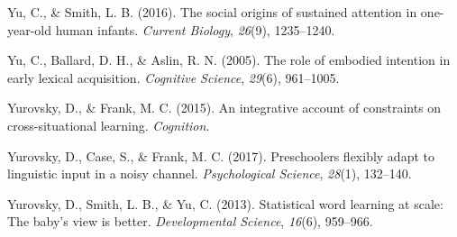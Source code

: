 \documentclass[oneside]{report}
\begin{document}
\hypertarget{ref-yu2016social}{}
Yu, C., \& Smith, L. B. (2016). The social origins of sustained
attention in one-year-old human infants. \emph{Current Biology},
\emph{26}(9), 1235--1240.

\hypertarget{ref-yu2005role}{}
Yu, C., Ballard, D. H., \& Aslin, R. N. (2005). The role of embodied
intention in early lexical acquisition. \emph{Cognitive Science},
\emph{29}(6), 961--1005.

\hypertarget{ref-yurovsky2014algorithmic}{}
Yurovsky, D., \& Frank, M. C. (2015). An integrative account of
constraints on cross-situational learning. \emph{Cognition}.

\hypertarget{ref-yurovsky2017preschoolers}{}
Yurovsky, D., Case, S., \& Frank, M. C. (2017). Preschoolers flexibly
adapt to linguistic input in a noisy channel. \emph{Psychological
Science}, \emph{28}(1), 132--140.

\hypertarget{ref-yurovsky2013statistical}{}
Yurovsky, D., Smith, L. B., \& Yu, C. (2013). Statistical word learning
at scale: The baby's view is better. \emph{Developmental Science},
\emph{16}(6), 959--966.


\end{document}
